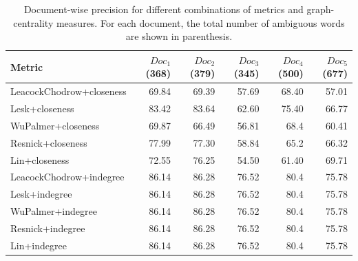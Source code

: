 \documentclass[12pt,letterpaper]{article}
\begin{document}
\begin{table} 
\begin{tabular}{|l|r|r|r|r|r|}
Metric & $Doc_1$ (368) & $Doc_2$ (379) & $Doc_3$ (345) & $Doc_4$ (500) & $Doc_5$ (677) \\
\hline
LeacockChodrow+closeness & 69.84 & 69.39 & 57.69 & 68.40 & 57.01 \\
Lesk+closeness & 83.42 & 83.64 & 62.60 & 75.40 & 66.77 \\
WuPalmer+closeness & 69.87 & 66.49 & 56.81 & 68.4 & 60.41 \\
Resnick+closeness & 77.99 & 77.30 & 58.84 & 65.2 & 66.32 \\
Lin+closeness & 72.55 & 76.25 & 54.50 & 61.40 & 69.71 \\
LeacockChodrow+indegree & 86.14 & 86.28 & 76.52 & 80.4 & 75.78 \\
Lesk+indegree & 86.14 & 86.28 & 76.52 & 80.4 & 75.78 \\
WuPalmer+indegree & 86.14 & 86.28 & 76.52 & 80.4 & 75.78 \\
Resnick+indegree & 86.14 & 86.28 & 76.52 & 80.4 & 75.78 \\
Lin+indegree & 86.14 & 86.28 & 76.52 & 80.4 & 75.78 \\
\end{tabular}
\caption{Document-wise precision for different combinations of metrics and graph-centrality measures. For each document, the total number of ambiguous words are shown in parenthesis.}
\label{table:3}
\end{table}
\end{document}
